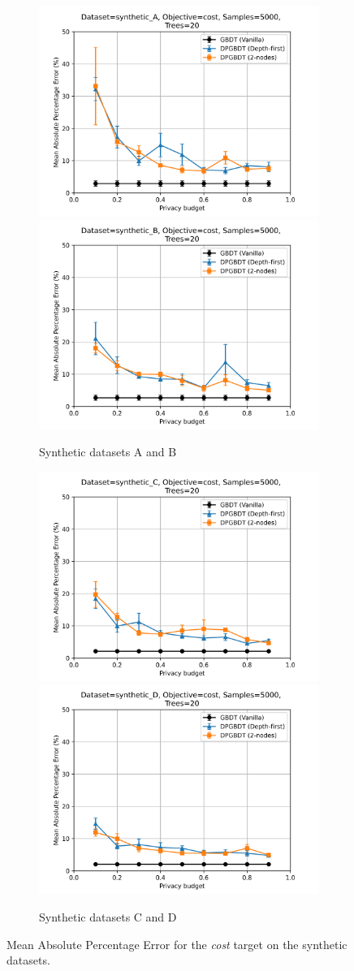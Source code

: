 \begin{figure}[h!]
  \begin{subfigure}{\linewidth}
  \includegraphics[width=.5\linewidth]{images/evaluation/synthetic_A_cost_5000.png}\hfill
  \includegraphics[width=.5\linewidth]{images/evaluation/synthetic_B_cost_5000.png}
  \caption{Synthetic datasets A and B}
  \end{subfigure}\par\medskip
  \begin{subfigure}{\linewidth}
  \includegraphics[width=.5\linewidth]{images/evaluation/synthetic_C_cost_5000.png}\hfill
  \includegraphics[width=.5\linewidth]{images/evaluation/synthetic_D_cost_5000.png}
  \caption{Synthetic datasets C and D}
  \end{subfigure}
  \caption{\label{fig:results_synthetic_cost}Mean Absolute Percentage Error for the \textit{cost} target on the synthetic datasets.}
\end{figure}
